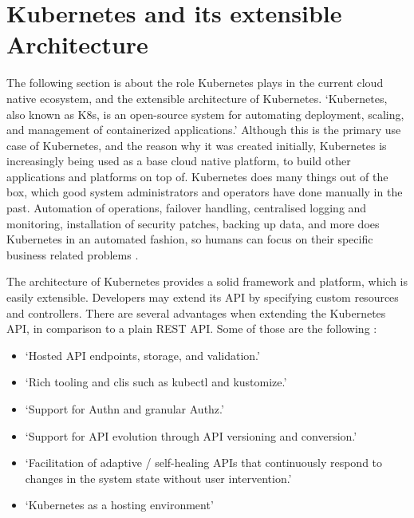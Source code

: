 \section{Kubernetes and its extensible Architecture}
\label{theoretical-background:kubernetes}

The following section is about
the role Kubernetes plays in the current cloud native ecosystem,
and the extensible architecture of Kubernetes.
\enquote*{Kubernetes, also known as K8s, is an open-source system for automating deployment, scaling, and management of containerized applications.}
\autocite{kubernetesIoWebsite}
Although this is the primary use case of Kubernetes,
and the reason why it was created initially,
Kubernetes is increasingly being used as a base cloud native platform,
to build other applications and platforms on top of.
Kubernetes does many things out of the box,
which good system administrators and operators
have done manually in the past.
Automation of operations, failover handling, centralised logging and monitoring,
installation of security patches, backing up data, and more
does Kubernetes in an automated fashion,
so humans can focus on their specific business related problems
\autocite{cloudNativeDevopsMitKubernetesArundel2019cloud}.

The architecture of Kubernetes provides a solid framework and platform,
which is easily extensible.
Developers may extend its API by specifying custom resources and controllers.
There are several advantages when extending the Kubernetes API,
in comparison to a plain REST API.
Some of those are the following
\autocite{kubebuilderBookWebsite}:

\begin{itemize}
	\item \enquote*{Hosted API endpoints, storage, and validation.}
	\item \enquote*{Rich tooling and clis such as kubectl and kustomize.}
	\item \enquote*{Support for Authn and granular Authz.}
	\item \enquote*{Support for API evolution through API versioning and conversion.}
	\item \enquote*{Facilitation of adaptive / self-healing APIs that continuously respond to changes in the system state without user intervention.}
	\item \enquote*{Kubernetes as a hosting environment}
	\autocite{kubebuilderBookWebsite}
\end{itemize}

